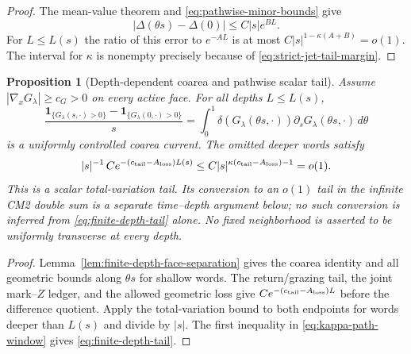 \documentclass[11pt]{article}
\newtheorem{proposition}[theorem]{Proposition}
\newcommand{\one}{\mathbf 1}
\begin{document}
\begin{proof}
The mean-value theorem and \eqref{eq:pathwise-minor-bounds} give
\[
 |\Delta(\theta s)-\Delta(0)|\le C|s|e^{BL}.
\]
For $L\le L(s)$ the ratio of this error to $e^{-AL}$ is at most
$C|s|^{1-\kappa(A+B)}=o(1)$.  The interval for $\kappa$ is nonempty precisely
because of \eqref{eq:strict-jet-tail-margin}.
\end{proof}

\begin{proposition}[Depth-dependent coarea and pathwise scalar tail]
\label{prop:parameter-state-master-refinement}
Assume $|\nabla_xG_\lambda|\ge c_G>0$ on every active face.  For all depths
$L\le L(s)$,
\begin{equation}
\label{eq:master-coarea-difference}
 \frac{\one_{\{G_\lambda(s,\cdot)>0\}}
             -\one_{\{G_\lambda(0,\cdot)>0\}}}{s}
 =\int_0^1\delta(G_\lambda(\theta s,\cdot))
   \partial_sG_\lambda(\theta s,\cdot)\,d\theta
\end{equation}
is a uniformly controlled coarea current.  The omitted deeper words satisfy
\begin{equation}
\label{eq:finite-depth-tail}
 |s|^{-1}\,Ce^{-(c_{\rm tail}-A_{\rm loss})L(s)}
 \le C|s|^{\kappa(c_{\rm tail}-A_{\rm loss})-1}=o(1).
\end{equation}
This is a scalar total-variation tail.  Its conversion to an $o(1)$ tail in
the infinite CM2 double sum is a separate time--depth argument below; no such
conversion is inferred from \eqref{eq:finite-depth-tail} alone.  No fixed
neighborhood is asserted to be uniformly transverse at every depth.
\end{proposition}

\begin{proof}
Lemma~\ref{lem:finite-depth-face-separation} gives the coarea identity and all
geometric bounds along $\theta s$ for shallow words.  The return/grazing tail,
the joint mark--$Z$ ledger, and the allowed geometric loss give
$Ce^{-(c_{\rm tail}-A_{\rm loss})L}$ before the difference quotient.  Apply
the total-variation bound to both endpoints for words deeper than $L(s)$ and
divide by $|s|$.  The first inequality in
\eqref{eq:kappa-path-window} gives \eqref{eq:finite-depth-tail}.
\end{proof}
\end{document}
